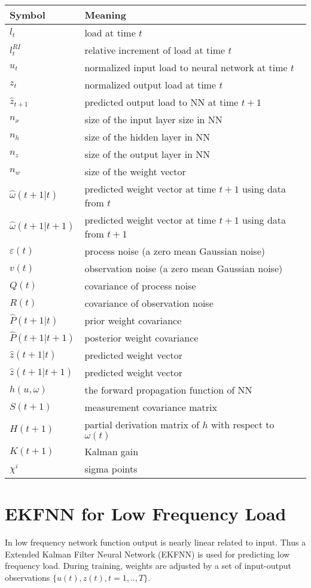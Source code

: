 \documentclass[letterpaper]{article}
\begin{document}
\begin{tabular}{|l|l|}
  \hline
  Symbol & Meaning \\
  \hline
  $l_t$ & load at time $t$ \\
  $l_t^{RI}$ & relative increment of load at time $t$ \\
  $u_t$ & normalized input load to neural network at time $t$ \\
  $z_t$ & normalized output load at time $t$ \\
  $\hat{z}_{t+1}$ & predicted output load to NN at time $t+1$ \\
  $n_x$ & size of the input layer size in NN \\
  $n_h$ & size of the hidden layer in NN \\
  $n_z$ & size of the output layer in NN \\
  $n_w$ & size of the weight vector \\
  $\hat{\omega}(t+1|t)$ & predicted weight vector at time $t+1$ using data from $t$ \\
  $\hat{\omega}(t+1|t+1)$ & predicted weight vector at time $t+1$ using data from $t+1$ \\
  $\varepsilon(t)$ & process noise (a zero mean Gaussian noise) \\
  $v(t)$ & observation noise (a zero mean Gaussian noise)\\
  $Q(t)$ & covariance of process noise \\
  $R(t)$ & covariance of observation noise\\
  $\hat{P}(t+1|t)$ & prior weight covariance \\
  $\hat{P}(t+1|t+1)$ & posterior weight covariance \\
  $\hat{z}(t+1|t)$ & predicted weight vector \\
  $\hat{z}(t+1|t+1)$ & predicted weight vector \\
  $h(u, \omega)$ & the forward propagation function of NN \\
  $S(t+1)$ & measurement covariance matrix \\
  $H(t+1)$ & partial derivation matrix of $h$ with respect to $\omega(t)$ \\
  $K(t+1)$ & Kalman gain \\
  $\chi^i$ & sigma points \\
  \hline
\end{tabular}

\section*{EKFNN for Low Frequency Load}
In low frequency network function output is nearly linear related to input. Thus a Extended Kalman Filter Neural Network (EKFNN) is used for predicting low frequency load. During training, weights are adjusted by a set of input-output observations $\{u(t), z(t), t=1,..,T\}$.
\end{document}

